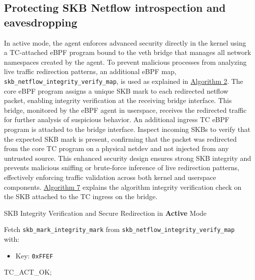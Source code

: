 \documentclass [11pt, proquest] {uwthesis}[2020/02/24]
\begin{document}
\subsection{Protecting SKB Netflow introspection and eavesdropping}
In active mode, the agent enforces advanced security directly in the kernel using a TC-attached eBPF program bound to the veth bridge that manages all network namespaces created by the agent. To prevent malicious processes from analyzing live traffic redirection patterns, an additional eBPF map, \texttt{skb\_netflow\_integrity\_verify\_map}, is used as explained in \hyperref[sec:alg2]{Algorithm 2}. The core eBPF program assigns a unique SKB mark to each redirected netflow packet, enabling integrity verification at the receiving bridge interface. This bridge, monitored by the eBPF agent in userspace, receives the redirected traffic for further analysis of suspicious behavior.
An additional ingress TC eBPF program is attached to the bridge interface. Inspect incoming SKBs to verify that the expected SKB mark is present, confirming that the packet was redirected from the core TC program on a physical netdev and not injected from any untrusted source. This enhanced security design ensures strong SKB integrity and prevents malicious sniffing or brute-force inference of live redirection patterns, effectively enforcing traffic validation across both kernel and userspace components. \hyperref[sec:alg7]{Algorithm 7} explains the algorithm integrity verification check on the SKB attached to the TC ingress on the bridge.

\begin{algorithm}[H]
\label{sec:alg7}
\caption{SKB Integrity Verification and Secure Redirection in \textbf{Active} Mode}
\label{sec:alg_active_mode_integrity}

\small
{}


Fetch \texttt{skb\_mark\_integrity\_mark} from \texttt{skb\_netflow\_integrity\_verify\_map} with:
\begin{itemize}[nosep]
    \item Key: \texttt{0xFFEF} 
\end{itemize}


\Return TC\_ACT\_OK;\
\end{algorithm}
\end{document}
